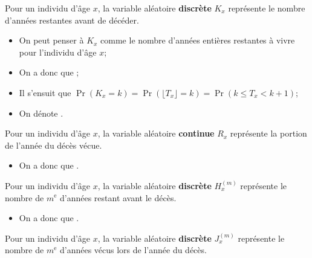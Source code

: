 \documentclass[10pt, french]{article}
\begin{document}
\begin{multicols*}{3}
\begin{definitionNOHFILLsub}
Pour un individu d'âge $x$, la variable aléatoire \textbf{discrète} $K_{x}$ représente le nombre d'années restantes avant de décéder.\\

\begin{itemize}[leftmargin = *]
	\item	On peut penser à $K_{x}$ comme le nombre d'années entières restantes à vivre pour l'individu d'âge $x$;
	\item	On a donc que ;
	\item	Il s'ensuit que $\Pr(K_x = k)	=	\Pr(\lfloor T_{x} \rfloor = k)	=	\Pr(k	\leq	T_{x}	< k + 1)$;
	\item	On dénote .
\end{itemize}
\end{definitionNOHFILLsub}

\begin{definitionNOHFILLsub}
Pour un individu d'âge $x$, la variable aléatoire \textbf{continue} $R_{x}$ représente la portion de l'année du décès vécue.\\

\begin{itemize}[leftmargin = *]
	\item	On a donc que .
\end{itemize}
\end{definitionNOHFILLsub}

\begin{definitionNOHFILLsub}
Pour un individu d'âge $x$, la variable aléatoire \textbf{discrète} $H^{(m)}_{x}$ représente le nombre de $m^{\text{e}}$ d'années restant avant le décès.\\

\begin{itemize}[leftmargin = *]
	\item	On a donc que .
\end{itemize}
\end{definitionNOHFILLsub}

\begin{definitionNOHFILLsub}
Pour un individu d'âge $x$, la variable aléatoire \textbf{discrète} $J^{(m)}_{x}$ représente le nombre de $m^{\text{e}}$ d'années vécus lors de l'année du décès.\\


\end{definitionNOHFILLsub}
\end{multicols*}
\end{document}
